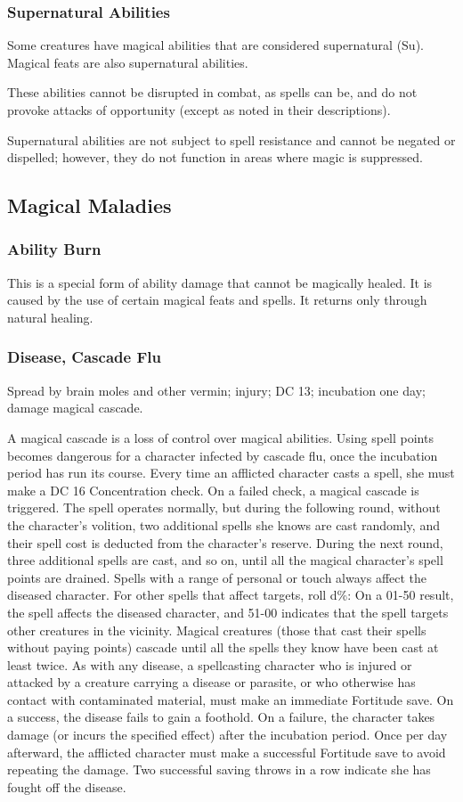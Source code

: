 \subsubsection{Supernatural Abilities}
Some creatures have magical abilities that are considered supernatural (Su). 
Magical feats are also supernatural abilities. 

These abilities cannot be disrupted in combat, as spells can be, and do not provoke attacks of opportunity (except as noted in their descriptions). 

Supernatural abilities are not subject to spell resistance and cannot be negated or dispelled; however, they do not function in areas where magic is suppressed.
\subsection{Magical Maladies}
\subsubsection{Ability Burn}
This is a special form of ability damage that cannot be magically healed. 
It is caused by the use of certain magical feats and spells. It returns only through natural healing.

\subsubsection{Disease, Cascade Flu}
Spread by brain moles and other vermin; injury; DC 13; incubation one day; damage magical cascade.

A magical cascade is a loss of control over magical abilities. Using spell points becomes dangerous for a character infected by cascade flu, once the incubation period has run its course. 
Every time an afflicted character casts a spell, she must make a DC 16 Concentration check. 
On a failed check, a magical cascade is triggered. 
The spell operates normally, but during the following round, without the character's volition, two additional spells she knows are cast randomly, and their spell cost is deducted from the character's reserve. 
During the next round, three additional spells are cast, and so on, until all the magical character's spell points are drained. 
Spells with a range of personal or touch always affect the diseased character. 
For other spells that affect targets, roll d\%: On a 01-50 result, the spell affects the diseased character, and 51-00 indicates that the spell targets other creatures in the vicinity. 
Magical creatures (those that cast their spells without paying points) cascade until all the spells they know have been cast at least twice.
As with any disease, a spellcasting character who is injured or attacked by a creature carrying a disease or parasite, or who otherwise has contact with contaminated material, must make an immediate Fortitude save. 
On a success, the disease fails to gain a foothold. 
On a failure, the character takes damage (or incurs the specified effect) after the incubation period. 
Once per day afterward, the afflicted character must make a successful Fortitude save to avoid repeating the damage. 
Two successful saving throws in a row indicate she has fought off the disease.
